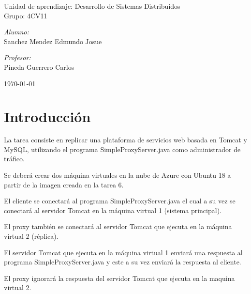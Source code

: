 \documentclass[11pt]{article}
\begin{document}
\begin{titlepage}
\begin{center}
				{ \Large Unidad de aprendizaje: Desarrollo de Sistemas Distribuidos} \\[1cm]
				
				{ \Large Grupo: 4CV11 } \\[1cm]
				
				\noindent
				\begin{minipage}{0.5\textwidth}
					\begin{flushleft} \large
						\emph{Alumno:} \\
						Sanchez Mendez Edmundo Josue
					\end{flushleft}
				\end{minipage}%
				\begin{minipage}{0.5\textwidth}
					\begin{flushright} \large
						\emph{Profesor:} \\
						Pineda Guerrero Carlos 
					\end{flushright}
				\end{minipage}
				
				\vfill
				{\large {\today}}
			\end{center}
		\end{titlepage}
	
	\titlepage
	\tableofcontents
	\newpage
	
	\section{Introducción}
	La tarea consiste en replicar una plataforma de servicios web basada en Tomcat y MySQL, utilizando el programa SimpleProxyServer.java como administrador de tráfico.

	Se deberá crear dos máquina virtuales en la nube de Azure con Ubuntu 18 a partir de la imagen creada en la tarea 6.

	El cliente se conectará al programa SimpleProxyServer.java el cual a su vez se conectará al servidor Tomcat en la máquina virtual 1 (sistema principal).

	El proxy también se conectará al servidor Tomcat que ejecuta en la máquina virtual 2 (réplica).

	El servidor Tomcat que ejecuta en la máquina virtual 1 enviará una respuesta al programa SimpleProxyServer.java y este a su vez enviará la respuesta al cliente. 

	El proxy ignorará la respuesta del servidor Tomcat que ejecuta en la maquina virtual 2.
	
\end{document}
